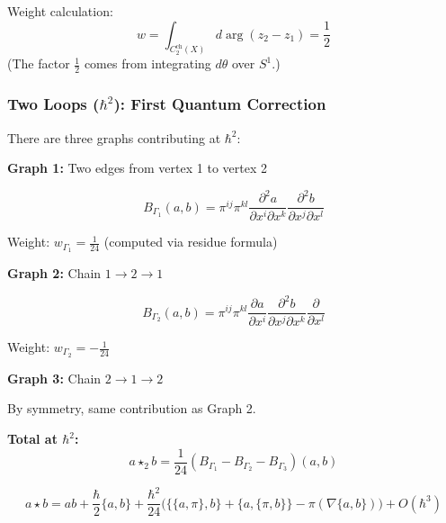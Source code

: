 Weight calculation:
$$w = \int_{C_2^{\text{ch}}(X)} d\arg(z_2 - z_1) = \frac{1}{2}$$
(The factor $\frac{1}{2}$ comes from integrating $d\theta$ over $S^1$.)

\subsubsection{Two Loops ($\hbar^2$): First Quantum Correction}

There are three graphs contributing at $\hbar^2$:

\textbf{Graph 1:} Two edges from vertex 1 to vertex 2
\begin{center}
\end{center}

$$B_{\Gamma_1}(a,b) = \pi^{ij} \pi^{kl} \frac{\partial^2 a}{\partial x^i \partial x^k} \frac{\partial^2 b}{\partial x^j \partial x^l}$$

Weight: $w_{\Gamma_1} = \frac{1}{24}$ (computed via residue formula)

\textbf{Graph 2:} Chain $1 \to 2 \to 1$
\begin{center}
\end{center}

$$B_{\Gamma_2}(a,b) = \pi^{ij} \pi^{kl} \frac{\partial a}{\partial x^i} \frac{\partial^2 b}{\partial x^j \partial x^k} \frac{\partial}{\partial x^l}$$

Weight: $w_{\Gamma_2} = -\frac{1}{24}$

\textbf{Graph 3:} Chain $2 \to 1 \to 2$

By symmetry, same contribution as Graph 2.

\textbf{Total at $\hbar^2$:}
$$a \star_2 b = \frac{1}{24}\left(B_{\Gamma_1} - B_{\Gamma_2} - B_{\Gamma_3}\right)(a,b)$$

\begin{theorem}
$$a \star b = ab + \frac{\hbar}{2}\{a,b\} + \frac{\hbar^2}{24}\Big(\{\{a,\pi\}, b\} + \{a,\{\pi, b\}\} - \pi(\nabla\{a,b\})\Big) + O(\hbar^3)$$
\end{theorem}

